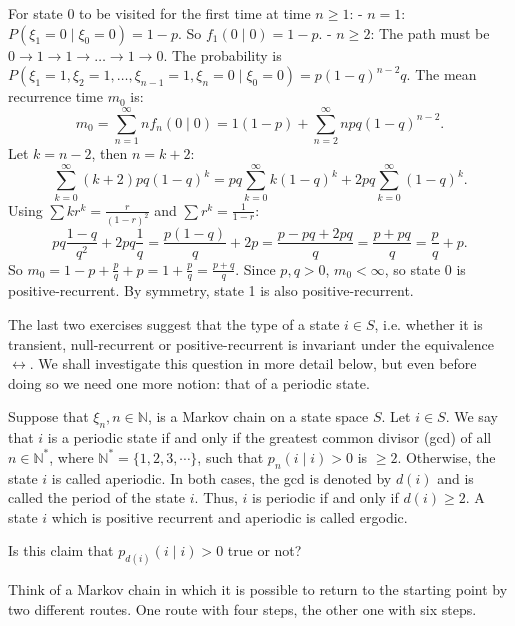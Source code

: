 \begin{Solution}
For state 0 to be visited for the first time at time $n \geq 1$:
- $n=1$: $P(\xi_1 = 0 \mid \xi_0 = 0) = 1-p$. So $f_1(0 \mid 0) = 1-p$.
- $n \geq 2$: The path must be $0 \to 1 \to 1 \to \dots \to 1 \to 0$.
The probability is $P(\xi_1=1, \xi_2=1, \dots, \xi_{n-1}=1, \xi_n=0 \mid \xi_0=0) = p (1-q)^{n-2} q$.
The mean recurrence time $m_0$ is:
\[
m_0 = \sum_{n=1}^\infty n f_n(0 \mid 0) = 1(1-p) + \sum_{n=2}^\infty n p q (1-q)^{n-2}.
\]
Let $k = n-2$, then $n = k+2$:
\[
\sum_{k=0}^\infty (k+2) p q (1-q)^k = pq \sum_{k=0}^\infty k(1-q)^k + 2pq \sum_{k=0}^\infty (1-q)^k.
\]
Using $\sum k r^k = \frac{r}{(1-r)^2}$ and $\sum r^k = \frac{1}{1-r}$:
\[
pq \frac{1-q}{q^2} + 2pq \frac{1}{q} = \frac{p(1-q)}{q} + 2p = \frac{p-pq+2pq}{q} = \frac{p+pq}{q} = \frac{p}{q} + p.
\]
So $m_0 = 1-p + \frac{p}{q} + p = 1 + \frac{p}{q} = \frac{p+q}{q}$.
Since $p, q > 0$, $m_0 < \infty$, so state 0 is positive-recurrent. By symmetry, state 1 is also positive-recurrent.
\end{Solution}

The last two exercises suggest that the type of a state $i\in S$, i.e. whether it is transient, null-recurrent or positive-recurrent is invariant under the equivalence $\leftrightarrow$. We shall investigate this question in more detail below, but even before doing so we need one more notion: that of a periodic state.

\begin{Definition}
\label{def:periodic}
Suppose that $\xi_n, n\in\mathbb{N}$, is a Markov chain on a state space $S$. Let $i\in S$. We say that $i$ is a periodic state if and only if the greatest common divisor (gcd) of all $n\in\mathbb{N}^*$, where $\mathbb{N}^* = \{1,2,3,\cdots\}$, such that $p_n(i \mid i) > 0$ is $\geq 2$. Otherwise, the state $i$ is called aperiodic. In both cases, the gcd is denoted by $d(i)$ and is called the period of the state $i$. Thus, $i$ is periodic if and only if $d(i) \geq 2$. A state $i$ which is positive recurrent and aperiodic is called ergodic.
\end{Definition}

\begin{Exercise}
\label{exr:period-positive}
Is this claim that $p_{d(i)}(i \mid i) > 0$ true or not?

\begin{hint}
Think of a Markov chain in which it is possible to return to the starting point by two different routes. One route with four steps, the other one with six steps.
\end{hint}
\end{Exercise}

